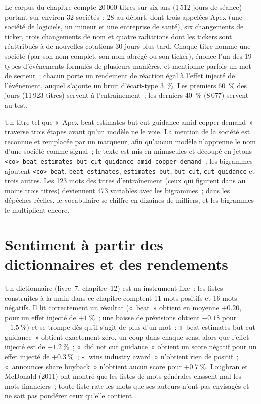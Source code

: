 Le corpus du chapitre compte 20\,000 titres sur six ans (1\,512 jours de séance) portant sur environ 32 sociétés~: 28 au départ,
dont trois appelées Apex (une société de logiciels, un mineur et une entreprise de santé), six changements de ticker, trois changements de nom et quatre
radiations dont les tickers sont réattribués à de nouvelles cotations 30 jours plus tard. Chaque titre nomme une société (par son nom complet, son
nom abrégé ou son ticker), énonce l'un des 19 types d'événements formulés de plusieurs manières, et mentionne parfois un mot
de secteur~; chacun porte un rendement de réaction égal à l'effet injecté de l'événement, auquel s'ajoute un bruit d'écart-type 3~\%. Les premiers
60~\% des jours (11\,923 titres) servent à l'entraînement~; les derniers 40~\% (8\,077) servent au test.

Un titre tel que «~Apex beat estimates but cut guidance amid copper demand~» traverse trois étapes avant qu'un modèle ne le voie.
La mention de la société est reconnue et remplacée par un marqueur, afin qu'aucun modèle n'apprenne le nom d'une société comme
signal~; le texte est mis en minuscules et découpé en jetons
\texttt{<co> beat estimates but cut guidance amid copper demand}~; les bigrammes ajoutent \texttt{<co> beat}, \texttt{beat estimates}, \texttt{estimates but}, \texttt{but cut},
\texttt{cut guidance} et trois autres. Les 123 mots des titres d'entraînement (ceux qui figurent dans au moins trois titres) deviennent 473
variables avec les bigrammes~; dans les dépêches réelles, le vocabulaire se chiffre en dizaines de milliers, et les bigrammes le multiplient encore.

\section{Sentiment à partir des dictionnaires et des rendements}

Un dictionnaire (livre~7, chapitre~12) est un instrument fixe~: les listes construites à la main dans ce chapitre comptent 11 mots positifs et 16 mots
négatifs. Il lit correctement un résultat («~beat~» obtient en moyenne $+0.20$, pour un effet injecté de $+1~\%$~; une baisse de prévisions
obtient $-0.18$ pour $-1.5~\%$) et se trompe dès qu'il s'agit de plus d'un mot~: «~beat estimates but cut guidance~» obtient
exactement zéro, un coup dans chaque sens, alors que l'effet injecté est de $-1.2~\%$~; «~did not cut guidance~» obtient un score négatif pour un
effet injecté de $+0.3~\%$~; «~wins industry award~» n'obtient rien de positif~; «~announces share buyback~» n'obtient aucun score pour
$+0.7~\%$. Loughran et McDonald (2011) ont montré que les listes de mots générales classent mal les mots financiers~; toute liste rate les
mots que ses auteurs n'ont pas envisagés et ne sait pas pondérer ceux qu'elle contient.


